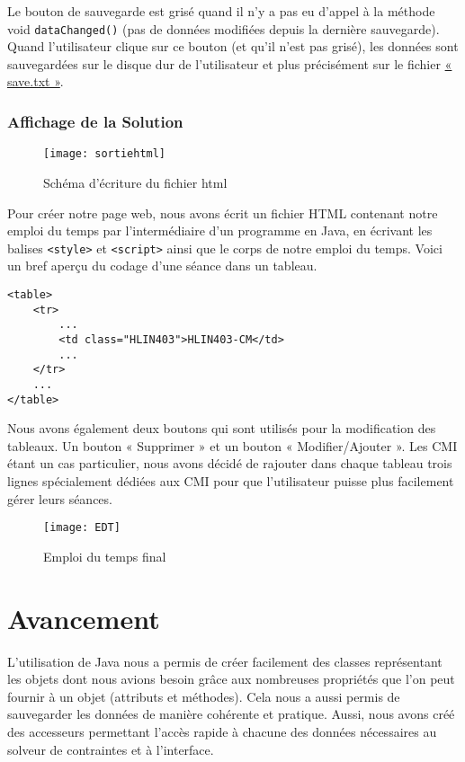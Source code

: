 \documentclass[12pt,a4paper]{article}
\begin{document}
Le bouton de sauvegarde est grisé quand il n’y a pas eu d’appel à la méthode void \texttt{dataChanged()} (pas de données modifiées depuis la dernière sauvegarde). Quand l’utilisateur clique sur ce bouton (et qu’il n’est pas grisé), les données sont sauvegardées sur le disque dur de l’utilisateur et plus précisément sur le fichier \hyperref[save]{« save.txt »}.


\subsubsection{Affichage de la Solution}

\begin{figure}[h]
    \label{schéma}  
    \centering
    \texttt{[image: sortiehtml]}
    \caption{Schéma d'écriture du fichier html}
\end{figure}

Pour créer notre page web, nous avons écrit un fichier HTML contenant notre emploi du temps par l'intermédiaire d'un programme en Java, en écrivant les balises \texttt{<style>} et \texttt{<script>} ainsi que le corps de notre emploi du temps. Voici un bref aperçu du codage d'une séance dans un tableau.
\newpage
\begin{verbatim}
<table>
    <tr>
        ...
        <td class="HLIN403">HLIN403-CM</td>
        ...
    </tr>
    ...
</table>
\end{verbatim}
Nous avons également deux boutons qui sont utilisés pour la modification des tableaux. Un bouton « Supprimer » et un bouton « Modifier/Ajouter ». Les CMI étant un cas particulier, nous avons décidé de rajouter dans chaque tableau trois lignes spécialement dédiées aux CMI pour que l'utilisateur puisse plus facilement gérer leurs séances. 

\begin{figure}[h]
    \label{EDT}
    \centering  
    \texttt{[image: EDT]} 
    \caption{Emploi du temps final}
\end{figure}

\section{Avancement}

L'utilisation de Java nous a permis de créer facilement des classes représentant les objets dont nous avions besoin grâce aux nombreuses propriétés que l'on peut fournir à un objet (attributs et méthodes). Cela nous a aussi permis de sauvegarder les données de manière cohérente et pratique. Aussi, nous avons créé des accesseurs permettant l'accès rapide à chacune des données nécessaires au solveur de contraintes et à l'interface.
\end{document}
